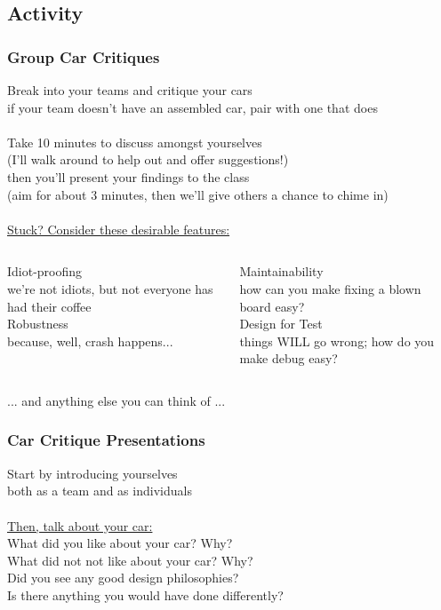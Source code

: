 \documentclass{beamer}
\begin{document}
\subsection{Activity}

\begin{frame}
\frametitle{Group Car Critiques}
\centering
Break into your teams and critique your cars \\
{\tiny if your team doesn't have an assembled car, pair with one that does} \\
\hfill \\
Take 10 minutes to discuss amongst yourselves \\
{\tiny (I'll walk around to help out and offer suggestions!)} \\
then you'll present your findings to the class \\
{\tiny (aim for about 3 minutes, then we'll give others a chance to chime in)} \\
\hfill \\
\underline{Stuck? Consider these desirable features:} \\
{\footnotesize
\begin{columns}[t]
  \centering
  Idiot-proofing \\
  {\tiny we're not idiots, but not everyone has had their coffee} \\
  Robustness \\
  {\tiny because, well, crash happens...}

  \centering
  Maintainability \\
  {\tiny how can you make fixing a blown board easy?} \\
  Design for Test \\
  {\tiny things WILL go wrong; how do you make debug easy?} \\
\end{columns}
... and anything else you can think of ... \\
}
\end{frame}

\begin{frame}
\frametitle{Car Critique Presentations}
\centering
Start by introducing yourselves \\
{\tiny both as a team and as individuals} \\
\hfill \\
\underline{Then, talk about your car:} \\
What did you like about your car? Why? \\
What did not not like about your car? Why? \\
Did you see any good design philosophies? \\
Is there anything you would have done differently? \\
\end{frame}
\end{document}
